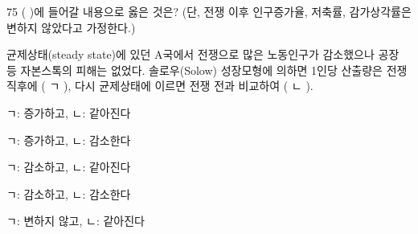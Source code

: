 \begin{question}{75}
( )에 들어갈 내용으로 옳은 것은? (단, 전쟁 이후 인구증가율, 저축률, 감가상각률은 변하지 않았다고 가정한다.)
\begin{framedtext}
균제상태(steady state)에 있던 A국에서 전쟁으로 많은 노동인구가 감소했으나 공장 등 자본스톡의 피해는 없었다. 솔로우(Solow) 성장모형에 의하면 1인당 산출량은 전쟁 직후에 ( ㄱ ), 다시 균제상태에 이르면 전쟁 전과 비교하여 ( ㄴ ).
\end{framedtext}
\begin{choices}
  \item ㄱ: 증가하고, ㄴ: 같아진다
  \item ㄱ: 증가하고, ㄴ: 감소한다
  \item ㄱ: 감소하고, ㄴ: 같아진다
  \item ㄱ: 감소하고, ㄴ: 감소한다
  \item ㄱ: 변하지 않고, ㄴ: 같아진다
\end{choices}
\end{question}
